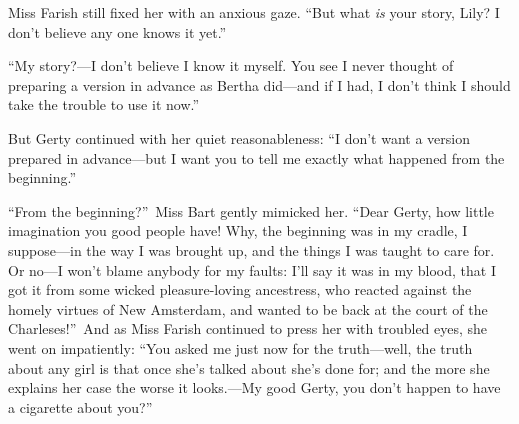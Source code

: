 \documentclass[12pt,a4paper]{book}
\begin{document}
Miss Farish still fixed her with an anxious gaze. ``But what \textit{is}
your story, Lily? I don't believe any one knows it yet.''





``My story?---I don't believe I know it myself. You see I never
thought of preparing a version in advance as Bertha did---and if I
had, I don't think I should take the trouble to use it now.''





But Gerty continued with her quiet reasonableness: ``I don't want
a version prepared in advance---but I want you to tell me exactly
what happened from the beginning.''





``From the beginning?''\ Miss Bart gently mimicked her. ``Dear Gerty,
how little imagination you good people have! Why, the beginning
was in my cradle, I suppose---in the way I was brought up, and the
things I was taught to care for. Or no---I won't blame anybody for
my faults: I'll say it was in my blood, that I got it from some
wicked pleasure-loving ancestress, who reacted against the homely
virtues of New Amsterdam, and wanted to be back at the court of
the Charleses!''\ And as Miss Farish continued to press her with
troubled eyes, she went on impatiently: ``You asked me just now
for the truth---well, the truth about any girl is that once she's
talked about she's done for; and the more she explains her case
the worse it looks.---My good Gerty, you don't happen to have a
cigarette about you?''
\end{document}

